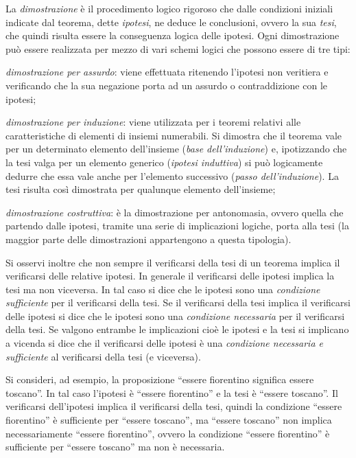 La \emph{dimostrazione} è il procedimento logico rigoroso che dalle condizioni iniziali indicate dal teorema, dette \emph{ipotesi}, ne deduce le conclusioni, ovvero la sua \emph{tesi}, che quindi risulta essere la conseguenza logica delle ipotesi.
Ogni dimostrazione può essere realizzata per mezzo di vari schemi logici che possono essere di tre tipi:

\begin{itemize*}
\item \emph{dimostrazione per assurdo}: viene effettuata ritenendo l'ipotesi non veritiera e verificando che la sua negazione porta ad un assurdo o contraddizione con le ipotesi;
\item \emph{dimostrazione per induzione}: viene utilizzata per i teoremi relativi alle caratteristiche di elementi di insiemi numerabili. Si dimostra che il teorema vale per un determinato elemento dell'insieme (\emph{base dell'induzione}) e, ipotizzando che la tesi valga per un elemento generico (\emph{ipotesi induttiva}) si può logicamente dedurre che essa vale anche per l'elemento successivo (\emph{passo dell'induzione}). La tesi risulta così dimostrata per qualunque elemento dell'insieme;
\item \emph{dimostrazione costruttiva}: è la dimostrazione per antonomasia, ovvero quella che partendo dalle ipotesi, tramite una serie di implicazioni logiche, porta alla tesi (la maggior parte delle dimostrazioni appartengono a questa tipologia).
\end{itemize*}

Si osservi inoltre che non sempre il verificarsi della tesi di un teorema implica il verificarsi delle relative ipotesi. In generale il verificarsi delle ipotesi implica la tesi ma non viceversa. In tal caso si dice che le ipotesi sono una \emph{condizione sufficiente} per il verificarsi della tesi. Se il verificarsi della tesi implica il verificarsi delle ipotesi si dice che le ipotesi sono una \emph{condizione necessaria} per il verificarsi della tesi. Se valgono entrambe le implicazioni cioè le ipotesi e la tesi si implicano a vicenda si dice che il verificarsi delle ipotesi è una \emph{condizione necessaria e sufficiente} al verificarsi della tesi (e viceversa).

Si consideri, ad esempio, la proposizione ``essere fiorentino significa essere toscano''.
In tal caso l'ipotesi è ``essere fiorentino'' e la tesi è ``essere toscano''. Il verificarsi dell'ipotesi implica il verificarsi della tesi, quindi la condizione ``essere fiorentino'' è sufficiente per ``essere toscano'', ma ``essere toscano'' non implica necessariamente ``essere fiorentino'', ovvero la condizione ``essere fiorentino'' è sufficiente per ``essere toscano'' ma non è necessaria.

